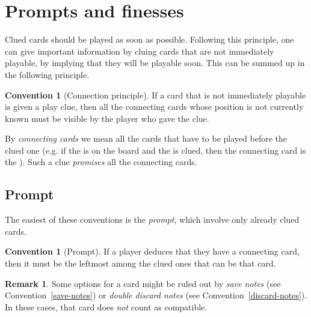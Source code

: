 \documentclass[a4paper]{article}
\theoremstyle{plain}
\theoremstyle{definition}
\newtheorem{remark}[theorem]{Remark}
\newtheorem{convention}[theorem]{Convention}
\begin{document}
\section{Prompts and finesses}

Clued cards should be played as soon as possible. Following this principle, one can give important information by cluing cards that are not immediately playable, by implying that they will be playable soon. This can be summed up in the following principle.

\begin{convention}[Connection principle]
	\label{connection-principle}
	If a card that is not immediately playable is given a play clue, then all the connecting cards whose position is not currently known must be visible by the player who gave the clue.
\end{convention}

By \emph{connecting cards} we mean all the cards that have to be played before the clued one (e.g. if the  is on the board and the  is clued, then the connecting card is the ). Such a clue \emph{promises} all the connecting cards.

\subsection{Prompt}

The easiest of these conventions is the \emph{prompt}, which involve only already clued cards.

\begin{convention}[Prompt]
	\label{prompt}
	If a player deduces that they have a connecting card, then it must be the leftmost among the clued ones that can be that card.
\end{convention}

\begin{remark}
	Some options for a card might be ruled out by \emph{save notes} (see Convention~\ref{save-notes}) or \emph{double discard notes} (see Convention~\ref{discard-notes}). In these cases, that card does \emph{not} count as compatible.
\end{remark}
\end{document}
